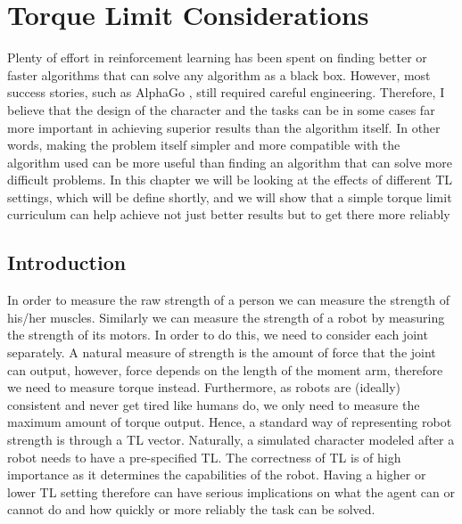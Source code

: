\chapter{Torque Limit Considerations}
\label{ch:envparams}

Plenty of effort in reinforcement learning has been spent on finding better or faster algorithms that can solve any algorithm as a black box. However, most success stories, such as AlphaGo \cite{alphago}, still required careful engineering. Therefore, I believe that the design of the character and the tasks can be in some cases far more important in achieving superior results than the algorithm itself. In other words, making the problem itself simpler and more compatible with the algorithm used can be more useful than finding an algorithm that can solve more difficult problems. In this chapter we will be looking at the effects of different \ac{TL} settings, which will be define shortly, and we will show that a simple torque limit curriculum can help achieve not just better results but to get there more reliably

\section{Introduction}
\label{sec:params_torque}

In order to measure the raw strength of a person we can measure the strength of his/her muscles. Similarly we can measure the strength of a robot by measuring the strength of its motors. In order to do this, we need to consider each joint separately. A natural measure of strength is the amount of force that the joint can output, however, force depends on the length of the moment arm, therefore we need to measure torque instead. Furthermore, as robots are (ideally) consistent and never get tired like humans do, we only need to measure the maximum amount of torque output. Hence, a standard way of representing robot strength is through a \ac{TL} vector. Naturally, a simulated character modeled after a robot needs to have a pre-specified \ac{TL}. The correctness of \ac{TL} is of high importance as it determines the capabilities of the robot. Having a higher or lower \ac{TL} setting therefore can have serious implications on what the agent can or cannot do and how quickly or more reliably the task can be solved.

